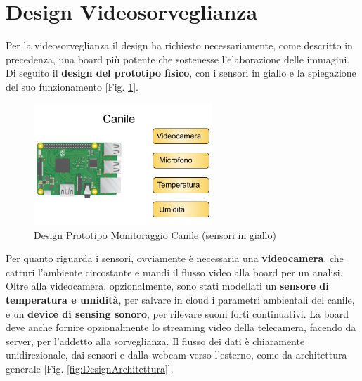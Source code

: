 \section{Design Videosorveglianza}
Per la videosorveglianza il design ha richiesto necessariamente, come descritto in precedenza, una board più potente che sostenesse l'elaborazione delle immagini. Di seguito il \textbf{design del prototipo fisico}, con i sensori in giallo e la spiegazione del suo funzionamento [Fig. \ref{fig:canile}]. 
    \begin{figure}[H]
        \caption{Design Prototipo Monitoraggio Canile (sensori in giallo)}
        \label{fig:canile}
        \centering
        \includegraphics[width=0.6\textwidth]{Images/Canile.png}
    \end{figure}
Per quanto riguarda i sensori, ovviamente è necessaria una \textbf{videocamera}, che catturi l'ambiente circostante e mandi il flusso video alla board per un analisi. Oltre alla videocamera, opzionalmente, sono stati modellati un \textbf{sensore di temperatura e umidità}, per salvare in cloud i parametri ambientali del canile, e un \textbf{device di sensing sonoro}, per rilevare suoni forti continuativi.
La board deve anche fornire opzionalmente lo streaming video della telecamera, facendo da server, per l'addetto alla sorveglianza. 
Il flusso dei dati è chiaramente unidirezionale, dai sensori e dalla webcam verso l'esterno, come da architettura generale [Fig. \ref{fig:DesignArchitettura}].

